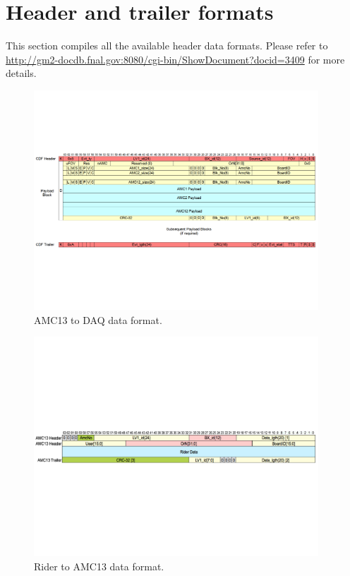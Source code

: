 \section{Header and trailer formats}

This section compiles all the available header data formats. Please refer to \url{http://gm2-docdb.fnal.gov:8080/cgi-bin/ShowDocument?docid=3409} for more details.

\begin{figure}[htbp]
\centering
\includegraphics[trim=0cm 6cm 0cm 6cm ,width=0.95\textwidth]{pics/AMC13Header}
\caption{AMC13 to DAQ data format.}
\end{figure}

\begin{figure}[htbp]
\centering
\includegraphics[trim=0cm 9.5cm 0cm 9.5cm ,width=0.95\textwidth]{pics/RiderToAMC13Header}
\caption{Rider to AMC13 data format.}
\end{figure}

